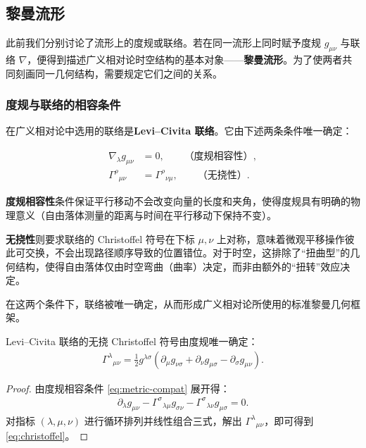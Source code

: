 \subsection{黎曼流形}

此前我们分别讨论了流形上的度规或联络。若在同一流形上同时赋予度规 $g_{\mu\nu}$ 与联络 $\nabla$，便得到描述广义相对论时空结构的基本对象——\textbf{黎曼流形}。为了使两者共同刻画同一几何结构，需要规定它们之间的关系。

\subsubsection{度规与联络的相容条件}

在广义相对论中选用的联络是\textbf{Levi--Civita 联络}。它由下述两条条件唯一确定：

\begin{align}
\nabla_{\lambda} g_{\mu\nu} &= 0,
\qquad  \text{（度规相容性）}, \label{eq:metric-compat}\\[6pt]
\Gamma^{\rho}{}_{\mu\nu} &= \Gamma^{\rho}{}_{\nu\mu},
\qquad \text{（无挠性）}. \label{eq:torsion-free}
\end{align}

\textbf{度规相容性}条件保证平行移动不会改变向量的长度和夹角，使得度规具有明确的物理意义（自由落体测量的距离与时间在平行移动下保持不变）。

\textbf{无挠性}则要求联络的 Christoffel 符号在下标 $\mu,\nu$ 上对称，意味着微观平移操作彼此可交换，不会出现路径顺序导致的位置错位。对于时空，这排除了“扭曲型”的几何结构，使得自由落体仅由时空弯曲（曲率）决定，而非由额外的“扭转”效应决定。

在这两个条件下，联络被唯一确定，从而形成广义相对论所使用的标准黎曼几何框架。

\begin{theorem}
Levi--Civita 联络的无挠 Christoffel 符号由度规唯一确定：
\begin{align}\label{eq:christoffel}
\Gamma^{\lambda}{}_{\mu\nu}
= \tfrac{1}{2} g^{\lambda\sigma}
\left(
\partial_{\mu} g_{\nu\sigma}
+ \partial_{\nu} g_{\mu\sigma}
- \partial_{\sigma} g_{\mu\nu}
\right).
\end{align}
\end{theorem}


\begin{proof}
由度规相容条件 \eqref{eq:metric-compat} 展开得：
\begin{align}
\partial_{\lambda} g_{\mu\nu}
- \Gamma^{\sigma}{}_{\lambda\mu} g_{\sigma\nu}
- \Gamma^{\sigma}{}_{\lambda\nu} g_{\mu\sigma} = 0.
\end{align}
对指标 $(\lambda, \mu, \nu)$ 进行循环排列并线性组合三式，解出 $\Gamma^{\lambda}{}_{\mu\nu}$，即可得到 \eqref{eq:christoffel}。
\end{proof}

